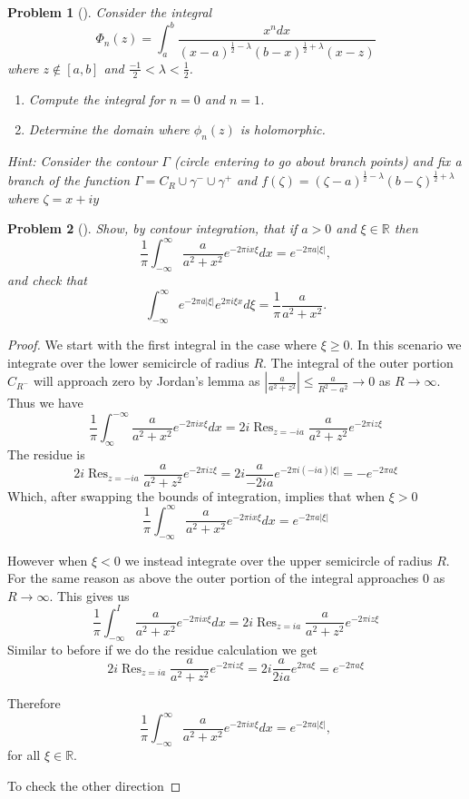 \documentclass[10pt]{article}
\newcommand{\sk}{\vskip 10mm}
\newcommand{\bb}[1]{\mathbb{#1}}
\DeclareMathOperator{\res}{Res}
\theoremstyle{plain}
\newtheorem{problem}{Problem}
\theoremstyle{remark}
\begin{document}
\begin{problem}[]
  Consider the integral
  \[
    \Phi_n(z) = \int_a^b \frac{x^ndx}{(x-a)^{\frac{1}{2}-\lambda} (b-x)^{\frac{1}{2}+ \lambda} (x-z)}
  \]
  where $z \notin [a,b]$ and $\frac{-1}{2} < \lambda < \frac{1}{2}$.
  
  \begin{enumerate}
  \item[(a)] Compute the integral for $n= 0$ and $n=1$.
  \item[(b)] Determine the domain where $\phi_n(z)$ is holomorphic.
  \end{enumerate}
  
  Hint: Consider the contour $\Gamma$ (circle entering to go about branch points) and fix a
  branch of the function $\Gamma = C_R \cup \gamma^- \cup \gamma^+$ and
  $f(\zeta) = (\zeta - a)^{\frac{1}{2} - \lambda}(b- \zeta) ^{\frac{1}{2} + \lambda}$
  where $\zeta = x+ iy$
\end{problem}


\sk

\begin{problem}[]
  Show, by contour integration, that if $a >0$ and $\xi \in \mathbb{R}$ then
  \[
    \frac{1}{\pi} \int_{-\infty}^\infty \frac{a}{a^2 + x^2}e^{-2\pi ix\xi}dx = e^{-2\pi a |\xi|},
  \]
  and check that 
  \[
    \int_{-\infty}^\infty e^{-2\pi a|\xi|}e^{2\pi i\xi x}d\xi = \frac{1}{\pi}\frac{a}{a^2 + x^2}.
  \]
\end{problem}

\begin{proof}
  We start with the first integral in the case where $\xi\geq 0$. In this scenario
  we integrate over the lower semicircle of radius $R$. The integral of the
  outer portion $C_{R^-}$ will approach zero by Jordan's lemma as
  $|\frac{a}{a^2+z^2}|\leq\frac{a}{R^2-a^2}\rightarrow 0 $ as $R\rightarrow\infty$. Thus we have
  \[
    \frac{1}{\pi}\int_\infty^{-\infty}\frac{a}{a^2 + x^2}e^{-2\pi ix\xi}dx = 2 i \res_{z=-ia}\frac{a}{a^2 + z^2}e^{-2\pi iz\xi}
  \]
  The residue is
  \[
    2i\res_{z=-ia}\frac{a}{a^2 + z^2}e^{-2\pi iz\xi}=2i\frac{a}{-2ia}e^{-2\pi i(-ia)|\xi|} = -e^{-2\pi a\xi}
  \]
  Which, after swapping the bounds of integration, implies that when $\xi>0$
  \[
    \frac{1}{\pi} \int_{-\infty}^\infty \frac{a}{a^2 + x^2}e^{-2\pi ix\xi}dx = e^{-2\pi a |\xi|}
  \]

  However when $\xi<0$ we instead integrate over the upper semicircle of radius $R$. For the
  same reason as above the outer portion of the integral approaches 0 as $R\rightarrow\infty$. This gives
  us
  \[
    \frac{1}{\pi}\int_{-\infty}^I\frac{a}{a^2 + x^2}e^{-2\pi ix\xi} dx = 2 i \res_{z=ia}\frac{a}{a^2 + z^2}e^{-2\pi iz\xi}
  \]
  Similar to before if we do the residue calculation we get
  \[
    2 i \res_{z=ia}\frac{a}{a^2 + z^2}e^{-2\pi iz\xi}= 2 i \frac{a}{2ia}e^{2\pi a\xi}=e^{-2\pi a\xi}
  \]

  Therefore
  \[
    \frac{1}{\pi} \int_{-\infty}^\infty \frac{a}{a^2 + x^2}e^{-2\pi ix\xi}dx = e^{-2\pi a |\xi|},
  \]
  for all $\xi\in \bb{R}$.

  To check the other direction
\end{proof}
\end{document}
